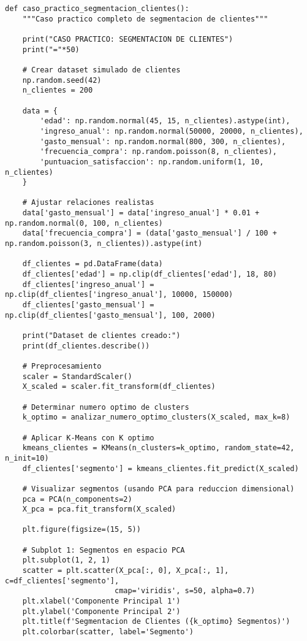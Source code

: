 \documentclass[12pt]{article}
\begin{document}
\begin{lstlisting}
def caso_practico_segmentacion_clientes():
    """Caso practico completo de segmentacion de clientes"""
    
    print("CASO PRACTICO: SEGMENTACION DE CLIENTES")
    print("="*50)
    
    # Crear dataset simulado de clientes
    np.random.seed(42)
    n_clientes = 200
    
    data = {
        'edad': np.random.normal(45, 15, n_clientes).astype(int),
        'ingreso_anual': np.random.normal(50000, 20000, n_clientes),
        'gasto_mensual': np.random.normal(800, 300, n_clientes),
        'frecuencia_compra': np.random.poisson(8, n_clientes),
        'puntuacion_satisfaccion': np.random.uniform(1, 10, n_clientes)
    }
    
    # Ajustar relaciones realistas
    data['gasto_mensual'] = data['ingreso_anual'] * 0.01 + np.random.normal(0, 100, n_clientes)
    data['frecuencia_compra'] = (data['gasto_mensual'] / 100 + np.random.poisson(3, n_clientes)).astype(int)
    
    df_clientes = pd.DataFrame(data)
    df_clientes['edad'] = np.clip(df_clientes['edad'], 18, 80)
    df_clientes['ingreso_anual'] = np.clip(df_clientes['ingreso_anual'], 10000, 150000)
    df_clientes['gasto_mensual'] = np.clip(df_clientes['gasto_mensual'], 100, 2000)
    
    print("Dataset de clientes creado:")
    print(df_clientes.describe())
    
    # Preprocesamiento
    scaler = StandardScaler()
    X_scaled = scaler.fit_transform(df_clientes)
    
    # Determinar numero optimo de clusters
    k_optimo = analizar_numero_optimo_clusters(X_scaled, max_k=8)
    
    # Aplicar K-Means con K optimo
    kmeans_clientes = KMeans(n_clusters=k_optimo, random_state=42, n_init=10)
    df_clientes['segmento'] = kmeans_clientes.fit_predict(X_scaled)
    
    # Visualizar segmentos (usando PCA para reduccion dimensional)
    pca = PCA(n_components=2)
    X_pca = pca.fit_transform(X_scaled)
    
    plt.figure(figsize=(15, 5))
    
    # Subplot 1: Segmentos en espacio PCA
    plt.subplot(1, 2, 1)
    scatter = plt.scatter(X_pca[:, 0], X_pca[:, 1], c=df_clientes['segmento'], 
                         cmap='viridis', s=50, alpha=0.7)
    plt.xlabel('Componente Principal 1')
    plt.ylabel('Componente Principal 2')
    plt.title(f'Segmentacion de Clientes ({k_optimo} Segmentos)')
    plt.colorbar(scatter, label='Segmento')
    

\end{lstlisting}
\end{document}
